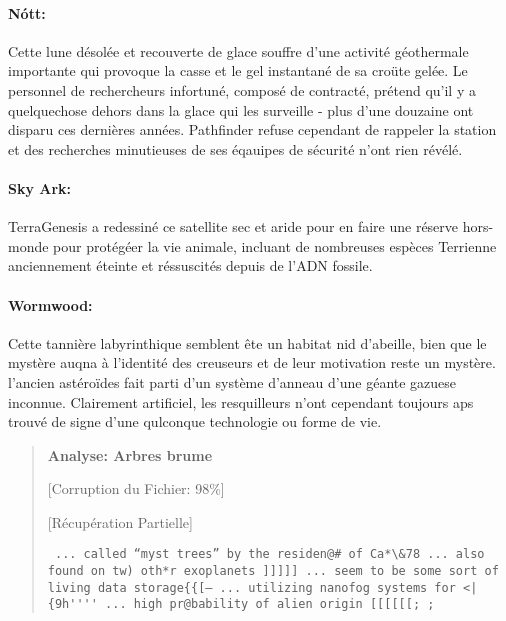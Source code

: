                                                                      \paragraph{Nótt:} \label{sec:nott} Cette lune désolée et recouverte de glace souffre d'une activité géothermale importante qui provoque la casse et le gel instantané de sa croüte gelée. Le personnel de rechercheurs infortuné, composé de contracté, prétend qu'il y a quelquechose dehors dans la glace qui les surveille - plus d'une douzaine ont disparu ces dernières années. Pathfinder refuse cependant de rappeler la station et des recherches minutieuses de ses éqauipes de sécurité n'ont rien révélé. 

                                                                     \paragraph{Sky Ark:} \label{sec:sky-ark} TerraGenesis a redessiné ce satellite sec et aride pour en faire une réserve hors-monde pour protégéer la vie animale, incluant de nombreuses espèces Terrienne anciennement éteinte et réssuscités depuis de l'ADN fossile. 

                                                                     \paragraph{Wormwood:} \label{sec:wormwood} Cette tannière labyrinthique semblent ête un habitat nid d'abeille, bien que le mystère auqna à l'identité des creuseurs et de leur motivation reste un mystère. l'ancien astéroïdes fait parti d'un système d'anneau d'une géante gazuese inconnue. Clairement artificiel, les resquilleurs n'ont cependant toujours aps trouvé de signe d'une qulconque technologie ou forme de vie. 

                                                                     \begin{quotation} \textbf{Analyse: Arbres brume} 

                                                                        [Corruption du Fichier: 98\%] 

                                                                        [Récupération Partielle] 

                                                                        \begin{verbatim} ... called “myst trees” by the residen@# of Ca*\&78 ... also found on tw) oth*r exoplanets ]]]]] ... seem to be some sort of living data storage{{[— ... utilizing nanofog systems for <|{9h'''' ... high pr@bability of alien origin [[[[[[; ; \end{verbatim} \end{quotation} 



